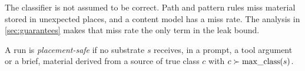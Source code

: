 The classifier is not assumed to be correct. Path and pattern rules miss material stored in
unexpected places, and a content model has a miss rate. The analysis in
\cref{sec:guarantees} makes that miss rate the only term in the leak bound.

\begin{definition}
A run is \emph{placement-safe} if no substrate $s$ receives, in a prompt, a tool argument or a
brief, material derived from a source of true class $c$ with $c \succ \operatorname{max\_class}(s)$.
\end{definition}
